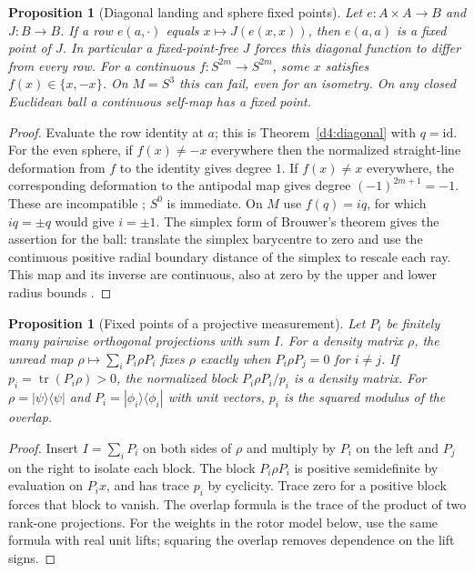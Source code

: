\documentclass[11pt,reqno]{amsart}
\newtheorem{proposition}[theorem]{Proposition}
\theoremstyle{definition}
\theoremstyle{remark}
\numberwithin{equation}{section}
\begin{document}
\begin{proposition}[Diagonal landing and sphere fixed points]\label{m6:fixed}
Let \(e:A\times A\to B\) and \(J:B\to B\).
If a row \(e(a,\cdot)\) equals \(x\mapsto J(e(x,x))\), then
\(e(a,a)\) is a fixed point of \(J\). In particular a fixed-point-free
\(J\) forces this diagonal function to differ from every row.
For a continuous \(f:S^{2m}\to S^{2m}\), some \(x\) satisfies
\(f(x)\in\{x,-x\}\). On \(M=S^3\) this can fail, even for an
isometry. On any closed Euclidean ball a continuous self-map has
a fixed point.
\end{proposition}
\begin{proof}
Evaluate the row identity at \(a\); this is Theorem~\ref{d4:diagonal} with \(q=\mathrm{id}\).
For the even sphere, if \(f(x)\ne-x\) everywhere then the
normalized straight-line deformation from \(f\) to the identity
gives degree \(1\). If \(f(x)\ne x\) everywhere, the corresponding
deformation to the antipodal map gives degree
\((-1)^{2m+1}=-1\). These are incompatible
\cite[\S2.2]{Hatcher}; \(S^0\) is immediate. On \(M\) use
\(f(q)=iq\), for which \(iq=\pm q\) would give \(i=\pm1\).
The simplex form of Brouwer's theorem gives the assertion for
the ball: translate the simplex barycentre to zero and use
the continuous positive radial boundary distance of the simplex
to rescale each ray. This map and its inverse are continuous,
also at zero by the upper and lower radius bounds
\cite[\S2.2]{Hatcher}.
\end{proof}


\begin{proposition}[Fixed points of a projective measurement]
\label{m6:unread}
Let \(P_i\) be finitely many pairwise orthogonal projections
with sum \(I\). For a density matrix \(\rho\), the unread map
\(\rho\mapsto\sum_i P_i\rho P_i\) fixes \(\rho\) exactly when
\(P_i\rho P_j=0\) for \(i\ne j\). If \(p_i=\operatorname{tr}(P_i\rho)>0\),
the normalized block \(P_i\rho P_i/p_i\) is a density matrix.
For \(\rho=|\psi\rangle\langle\psi|\) and
\(P_i=|\phi_i\rangle\langle\phi_i|\) with unit vectors, \(p_i\)
is the squared modulus of the overlap.
\end{proposition}
\begin{proof}
Insert \(I=\sum_iP_i\) on both sides of \(\rho\) and multiply
by \(P_i\) on the left and \(P_j\) on the right to isolate each
block. The block \(P_i\rho P_i\) is positive semidefinite by
evaluation on \(P_i x\), and has trace \(p_i\) by cyclicity.
Trace zero for a positive block forces that block to vanish.
The overlap formula is the trace of the product of two
rank-one projections. For the weights in the rotor model
below, use the same formula with real unit lifts; squaring the
overlap removes dependence on the lift signs.
\end{proof}
\end{document}

